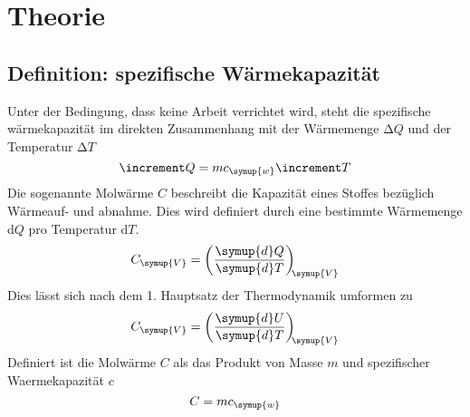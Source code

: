 \section{Theorie}
\label{sec:Theorie}
\subsection{Definition: spezifische Wärmekapazität}
Unter der Bedingung, dass keine Arbeit verrichtet wird, steht die spezifische
wärmekapazität im direkten Zusammenhang mit der Wärmemenge $\increment Q$ und
der Temperatur $\increment T$
\begin{equation}
  \increment Q = mc_\symup{w}\increment T
\end{equation}
Die sogenannte Molwärme $C$ beschreibt die Kapazität eines Stoffes bezüglich
Wärmeauf- und abnahme. Dies wird definiert durch eine bestimmte Wärmemenge
d$Q$ pro Temperatur d$T$.
\begin{equation}
  C_\symup{V} = \left(\frac{\symup{d}Q}{\symup{d}T}\right)_{\!\!\symup{V}}
\end{equation}
Dies lässt sich nach dem 1. Hauptsatz der Thermodynamik umformen zu
\begin{equation}
  C_\symup{V} = \left(\frac{\symup{d}U}{\symup{d}T}\right)_{\!\!\symup{V}}
  \label{eqn:CVdif}
\end{equation}
Definiert ist die Molwärme $C$ als das Produkt von Masse $m$ und spezifischer
Waermekapazität $c$
\begin{equation}
  C = mc_\symup{w}
\end{equation}

